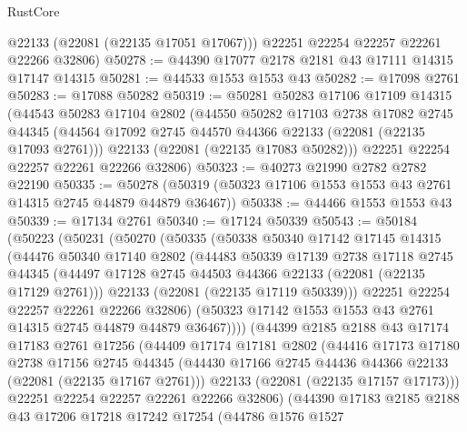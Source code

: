 \begin{lexlean}{RustCore}
\begin{coremodule}
        @22133
        (@22081 (@22135 @17051 @17067)))
      @22251
      @22254
      @22257
      @22261
      @22266
      @32806)
@50278 := @44390 @17077 @2178 @2181 @43 @17111 @14315 @17147 @14315
@50281 := @44533 @1553 @1553 @43
@50282 := @17098 @2761
@50283 := @17088 @50282
@50319 := @50281
    @50283
    @17106
    @17109
    @14315
    (@44543
      @50283
      @17104
      @2802
      (@44550
        @50282
        @17103
        @2738
        @17082
        @2745
        @44345
        (@44564 @17092 @2745 @44570 @44366 @22133 (@22081 (@22135 @17093 @2761)))
        @22133
        (@22081 (@22135 @17083 @50282)))
      @22251
      @22254
      @22257
      @22261
      @22266
      @32806)
@50323 := @40273 @21990 @2782 @2782 @22190
@50335 := @50278 (@50319 (@50323 @17106 @1553 @1553 @43 @2761 @14315 @2745 @44879 @44879 @36467))
@50338 := @44466 @1553 @1553 @43
@50339 := @17134 @2761
@50340 := @17124 @50339
@50543 := @50184
    (@50223
      (@50231
        (@50270
          (@50335
            (@50338
              @50340
              @17142
              @17145
              @14315
              (@44476
                @50340
                @17140
                @2802
                (@44483
                  @50339
                  @17139
                  @2738
                  @17118
                  @2745
                  @44345
                  (@44497 @17128 @2745 @44503 @44366 @22133 (@22081 (@22135 @17129 @2761)))
                  @22133
                  (@22081 (@22135 @17119 @50339)))
                @22251
                @22254
                @22257
                @22261
                @22266
                @32806)
              (@50323 @17142 @1553 @1553 @43 @2761 @14315 @2745 @44879 @44879 @36467))))
        (@44399
          @2185
          @2188
          @43
          @17174
          @17183
          @2761
          @17256
          (@44409
            @17174
            @17181
            @2802
            (@44416
              @17173
              @17180
              @2738
              @17156
              @2745
              @44345
              (@44430 @17166 @2745 @44436 @44366 @22133 (@22081 (@22135 @17167 @2761)))
              @22133
              (@22081 (@22135 @17157 @17173)))
            @22251
            @22254
            @22257
            @22261
            @22266
            @32806)
          (@44390
            @17183
            @2185
            @2188
            @43
            @17206
            @17218
            @17242
            @17254
            (@44786
              @1576
              @1527

\end{coremodule}
\end{lexlean}
